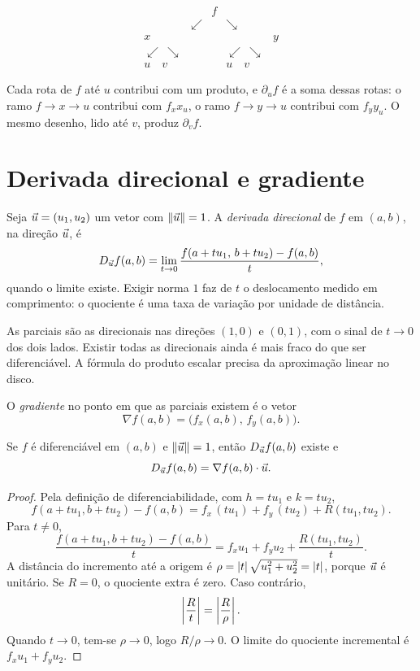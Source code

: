 \documentclass[11pt,a4paper]{article}
\begin{document}
\[
\begin{array}{ccccc}
 & & f & & \\
 & \swarrow & & \searrow & \\
x & & & & y \\
\swarrow\ \searrow & & & \swarrow\ \searrow & \\
u\quad v & & & u\quad v &
\end{array}
\]

Cada rota de $f$ até $u$ contribui com um produto, e $\partial_u f$ é a soma dessas rotas: o ramo $f\to x\to u$ contribui com $f_x x_u$, o ramo $f\to y\to u$ contribui com $f_y y_u$. O mesmo desenho, lido até $v$, produz $\partial_v f$.

\section{Derivada direcional e gradiente}

\begin{definicao}
Seja $\vec{u}=(u_1,u_2)$ um vetor com $\left\lVert \vec{u} \right\rVert=1$. A \emph{derivada direcional} de $f$ em $(a,b)$, na direção $\vec{u}$, é
\[
D_{\vec{u}} f(a,b)=\lim_{t\to 0}\frac{f(a+tu_1,\,b+tu_2)-f(a,b)}{t},
\]
quando o limite existe. Exigir norma $1$ faz de $t$ o deslocamento medido em comprimento: o quociente é uma taxa de variação por unidade de distância.
\end{definicao}

As parciais são as direcionais nas direções $(1,0)$ e $(0,1)$, com o sinal de $t\to 0$ dos dois lados. Existir todas as direcionais ainda é mais fraco do que ser diferenciável. A fórmula do produto escalar precisa da aproximação linear no disco.

O \emph{gradiente} no ponto em que as parciais existem é o vetor
\[
\nabla f(a,b)=\bigl(f_x(a,b),\,f_y(a,b)\bigr).
\]

\begin{teorema}
Se $f$ é diferenciável em $(a,b)$ e $\left\lVert \vec{u} \right\rVert=1$, então $D_{\vec{u}} f(a,b)$ existe e
\[
D_{\vec{u}} f(a,b)=\nabla f(a,b)\cdot\vec{u}.
\]
\end{teorema}

\begin{proof}
Pela definição de diferenciabilidade, com $h=tu_1$ e $k=tu_2$,
\[
f(a+tu_1,b+tu_2)-f(a,b)=f_x\,(tu_1)+f_y\,(tu_2)+R(tu_1,tu_2).
\]
Para $t\neq 0$,
\[
\frac{f(a+tu_1,b+tu_2)-f(a,b)}{t}=f_x u_1+f_y u_2+\frac{R(tu_1,tu_2)}{t}.
\]
A distância do incremento até a origem é $\rho=\left\lvert t \right\rvert\sqrt{u_1^2+u_2^2}=\left\lvert t \right\rvert$, porque $\vec{u}$ é unitário. Se $R=0$, o quociente extra é zero. Caso contrário,
\[
\left\lvert \frac{R}{t} \right\rvert=\left\lvert \frac{R}{\rho} \right\rvert.
\]
Quando $t\to 0$, tem-se $\rho\to 0$, logo $R/\rho\to 0$. O limite do quociente incremental é $f_x u_1+f_y u_2$.
\end{proof}
\end{document}
